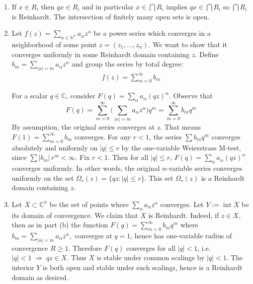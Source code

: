 \documentclass[12pt]{article}  %
\begin{document}
\begin{solution}
    \begin{enumerate}
        \item If $x \in R_i$ then $qx \in R_i$ and in particular $x\in \bigcap R_i$ implies $qx\in \bigcap R_i$ so $\bigcap R_i$ is Reinhardt. The intersection of finitely many open sets is open.
        \item Let
              $f(z) = \sum_{\alpha\in \mathbb{N}^n} a_\alpha z^\alpha$
              be a power series which converges in a neighborhood of some point $z=(z_1,\dots,z_n)$. We want to show that it converges uniformly in some Reinhardt domain containing $z$. Define $b_m = \sum_{|\alpha|=m} a_\alpha z^\alpha$ and group the series by total degree:
              \begin{align*}
                  f(z) = \sum_{m=0}^\infty b_m
              \end{align*}


              For a scalar $q\in \mathbb{C}$, consider $F(q) = \sum_{\alpha} a_\alpha (qz)^\alpha$. Observe that \[F(q) = \sum_{m=0}^\infty \Big(\sum_{|\alpha|=m} a_\alpha z^\alpha\Big) q^m = \sum_{m=0}^\infty b_m q^m\] By assumption, the original series converges at $z$. That means $F(1) = \sum_{m=0}^\infty b_m$ converges. For any $r<1$, the series $\sum b_m q^m$ converges absolutely and uniformly on $|q|\leq r$ by the one-variable Weierstrass M-test, since $\sum |b_m|\, r^m < \infty$. Fix $r<1$. Then for all $|q|\leq r$, $F(q) = \sum_{\alpha} a_\alpha (qz)^\alpha$ converges uniformly. In other words, the original $n$-variable series converges uniformly on the set $\Omega_r(z) = \{qz : |q|\leq r\}$. This set $\Omega_r(z)$ is a Reinhardt domain containing $z$.
            \item Let $X\subset\mathbb{C}^n$ be the set of points where $\sum_\alpha a_\alpha z^\alpha$ converges. Let $Y:=\operatorname{int}X$ be its domain of convergence. We claim that $X$ is Reinhardt. Indeed, if $z\in X$, then as in part (b) the function $F(q)=\sum_{m=0}^\infty b_m q^m$ where $b_m=\sum_{|\alpha|=m} a_\alpha z^\alpha,$ converges at $q=1$, hence has one-variable radius of convergence $R\ge 1$. Therefore $F(q)$ converges for all $|q|<1$, i.e. $|q|<1 \;\Rightarrow\; qz\in X.$ Thus $X$ is stable under common scalings by $|q|<1$. The interior $Y$ is both open and stable under such scalings, hence is a Reinhardt domain as desired.
    \end{enumerate}
\end{solution}
\end{document}

